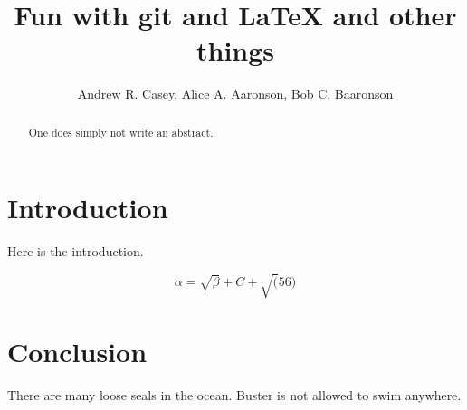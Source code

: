 \documentclass{article}
\begin{document}
\title{Fun with git and \LaTeX{} and other things}
\author{Andrew R. Casey, Alice A. Aaronson, Bob C. Baaronson}

\maketitle

\begin{abstract}
One does simply not write an abstract.
\end{abstract}

\section{Introduction}
Here is the introduction.

\begin{equation}
    \label{simple_equation}
    \alpha = \sqrt{ \beta } + C + \sqrt(56)
\end{equation}


\section{Conclusion}
There are many loose seals in the ocean. Buster is not allowed to swim anywhere.
\end{document}
